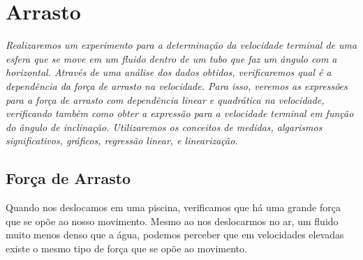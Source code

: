 \chapter{Arrasto} %
\label{Chap:ExpArrasto}        %

\begin{fullwidth}\it
	Realizaremos um experimento para a determinação da velocidade terminal de uma esfera que se move em um fluido dentro de um tubo que faz um ângulo com a horizontal. Através de uma análise dos dados obtidos, verificaremos qual é a dependência da força de arrasto na velocidade. Para isso, veremos as expressões para a força de arrasto com dependência linear e quadrática na velocidade, verificando também como obter a expressão para a velocidade terminal em função do ângulo de inclinação. Utilizaremos os conceitos de medidas, algarismos significativos, gráficos, regressão linear, e linearização.
\end{fullwidth}

\section{Força de Arrasto}

Quando nos deslocamos em uma piscina, verificamos que há uma grande força que se opõe ao nosso movimento. Mesmo ao nos deslocarmos no ar, um fluido muito menos denso que a água, podemos perceber que em velocidades elevadas existe o mesmo tipo de força que se opõe ao movimento. 

